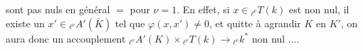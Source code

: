 sont pas nuls en général $=$ pour $\nu=1$. En effet,
si  $x\in{}_{\ell^\nu}T(k)$ est non nul, il existe un
$x'\in{}_{\ell^\nu}A'(\overline K)$ tel que \deleted{\unsure{$\varphi$}} $\varphi(x,x')\ne0$, et  quitte
à agrandir $K$ en $K'$, on aura donc un
accouplement ${}_{\ell^\nu}A'(K)\times{}_{\ell^\nu}T(k)\longrightarrow{}_{\ell^\nu}k^*$ non nul $\ldots$.
